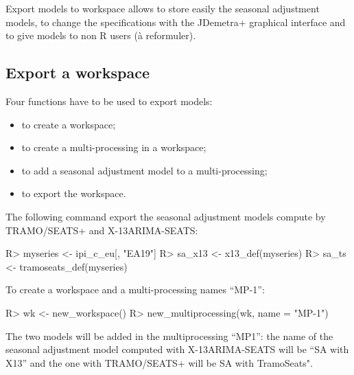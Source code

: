 \documentclass[article]{jss}
\providecommand{\tightlist}{%
  \setlength{\itemsep}{0pt}\setlength{\parskip}{0pt}}
\begin{document}
Export models to workspace allows to store easily the seasonal
adjustment models, to change the specifications with the JDemetra+
graphical interface and to give models to non R users (à reformuler).

\hypertarget{export-a-workspace}{%
\subsection{Export a workspace}\label{export-a-workspace}}

Four functions have to be used to export models:

\begin{itemize}
\tightlist
\item
   to create a workspace;\\
\item
   to create a multi-processing in a
  workspace;\\
\item
   to add a seasonal adjustment model to a
  multi-processing;\\
\item
   to export the workspace.
\end{itemize}

The following command export the seasonal adjustment models compute by
TRAMO/SEATS+ and X-13ARIMA-SEATS:

\begin{CodeChunk}

\begin{CodeInput}
R> myseries <- ipi_c_eu[, "EA19"]
R> sa_x13 <- x13_def(myseries)
R> sa_ts <- tramoseats_def(myseries)
\end{CodeInput}
\end{CodeChunk}

To create a workspace and a multi-processing names ``MP-1'':

\begin{CodeChunk}

\begin{CodeInput}
R> wk <- new_workspace()
R> new_multiprocessing(wk, name = "MP-1")
\end{CodeInput}
\end{CodeChunk}

The two models will be added in the multiprocessing ``MP1'': the name of
the seasonal adjustment model computed with X-13ARIMA-SEATS will be ``SA
with X13'' and the one with TRAMO/SEATS+ will be SA with TramoSeats".
\end{document}

